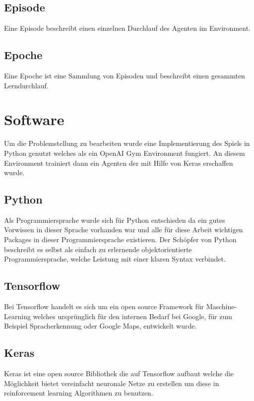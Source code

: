 \subsection{Episode}
Eine Episode beschreibt einen einzelnen Durchlauf des Agenten im Environment.

\subsection{Epoche}
Eine Epoche ist eine Sammlung von Episoden und beschreibt einen gesammten Lerndurchlauf.





\section{Software}
Um die Problemstellung zu bearbeiten wurde eine Implementierung des Spiels in Python genutzt welches als ein OpenAI Gym Environment fungiert. An diesem Environment trainiert dann ein Agenten der mit Hilfe von  Keras erschaffen wurde.

\subsection{Python}
Als Programmiersprache wurde sich für Python\cite{python} entschieden da ein gutes Vorwissen in dieser Sprache vorhanden war und alle für diese Arbeit wichtigen Packages in dieser Programmiersprache existieren.
Der Schöpfer von Python beschreibt es selbst als einfach zu erlernende objektorientierte Programmiersprache, welche Leistung mit einer klaren Syntax verbindet.\cite{PythonManual2009} \\

\subsection{Tensorflow}
Bei Tensorflow \cite{tensorflow} handelt es sich um ein open source Framework für Maschine-Learning welches ursprünglich für den internen Bedarf bei Google, für zum Beispiel Spracherkennung oder Google Maps, entwickelt wurde. 

\subsection{Keras}
Keras\cite{keras} ist eine open source Bibliothek die auf Tensorflow aufbaut welche die Möglichkeit bietet vereinfacht neuronale Netze zu erstellen um diese in reinforcement learning Algorithmen zu benutzen.

